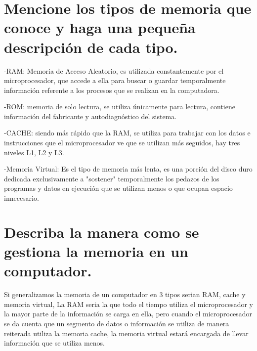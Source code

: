 \documentclass{article}
\begin{document}
\section{Mencione los tipos de memoria que conoce y haga una pequeña descripción de cada tipo.}

-RAM: Memoria de Acceso Aleatorio, es utilizada constantemente por el microprocesador, que accede a ella para buscar o guardar temporalmente información referente a los procesos que se realizan en la computadora. \cite{Venturini}

-ROM: memoria de solo lectura, se utiliza únicamente para lectura, contiene información del fabricante y autodiagnóstico del sistema. \cite{wiki}


-CACHE: siendo más rápido que la RAM, se utiliza para trabajar con los datos e instrucciones que el microprocesador ve que se utilizan más seguidos, hay tres niveles L1, L2 y L3.

-Memoria Virtual: Es el tipo de memoria más lenta, es una porción del disco duro dedicada exclusivamente a "sostener"  temporalmente los pedazos de los programas y datos en ejecución que se utilizan menos o que ocupan espacio innecesario.

\section{Describa la manera como se gestiona la memoria en un computador.}

Si generalizamos la memoria de un computador en 3 tipos serian RAM, cache y memoria virtual, La RAM seria la que todo el tiempo utiliza el microprocesador y la mayor parte de la información se carga en ella, pero cuando el microprocesador se da cuenta que un segmento de datos o información se utiliza de manera reiterada utiliza la memoria cache, la memoria virtual estará encargada de llevar información que se utiliza menos.
\end{document}
